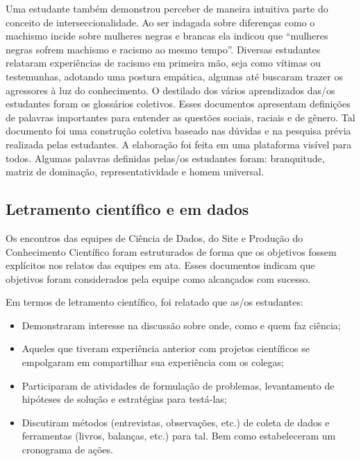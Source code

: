 \documentclass[
]{book}
\providecommand{\tightlist}{%
  \setlength{\itemsep}{0pt}\setlength{\parskip}{0pt}}
\begin{document}
Uma estudante também demonstrou perceber de maneira intuitiva parte do conceito de interseccionalidade. Ao ser indagada sobre diferenças como o machismo incide sobre mulheres negras e brancas ela indicou que ``mulheres negras sofrem machismo e racismo ao mesmo tempo''.
Diversas estudantes relataram experiências de racismo em primeira mão, seja como vítimas ou testemunhas, adotando uma postura empática, algumas até buscaram trazer os agressores à luz do conhecimento.
O destilado dos vários aprendizados das/os estudantes foram os glossários coletivos. Esses documentos apresentam definições de palavras importantes para entender as questões sociais, raciais e de gênero. Tal documento foi uma construção coletiva baseado nas dúvidas e na pesquisa prévia realizada pelas estudantes. A elaboração foi feita em uma plataforma visível para todos. Algumas palavras definidas pelas/os estudantes foram: branquitude, matriz de dominação, representatividade e homem universal.

\hypertarget{letramento-cientuxedfico-e-em-dados}{%
\subsection{Letramento científico e em dados}\label{letramento-cientuxedfico-e-em-dados}}

Os encontros das equipes de Ciência de Dados, do Site e Produção do Conhecimento Científico foram estruturados de forma que os objetivos fossem explícitos nos relatos das equipes em ata. Esses documentos indicam que objetivos foram considerados pela equipe como alcançados com sucesso.

Em termos de letramento científico, foi relatado que as/os estudantes:

\begin{itemize}
\tightlist
\item
  Demonstraram interesse na discussão sobre onde, como e quem faz ciência;
\item
  Aqueles que tiveram experiência anterior com projetos científicos se empolgaram em compartilhar sua experiência com os colegas;
\item
  Participaram de atividades de formulação de problemas, levantamento de hipóteses de solução e estratégias para testá-las;
\item
  Discutiram métodos (entrevistas, observações, etc.) de coleta de dados e ferramentas (livros, balanças, etc.) para tal. Bem como estabeleceram um cronograma de ações.
\end{itemize}
\end{document}
